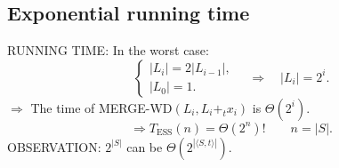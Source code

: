 \subsection{Exponential running time}
RUNNING TIME: In the worst case:
\[\begin{cases}|L_i|=2|L_{i-1}|,\\|L_0|=1.\end{cases}
\quad\Rightarrow\quad |L_i|=2^i.\]
$\Rightarrow$ The time of MERGE-WD$(L_i,L_i+_t x_i)$ is $\Theta(2^i)$.
\[\Rightarrow T_{\mathrm{ESS}}(n)=\Theta(2^n)!\qquad n=|S|.\]
OBSERVATION: $2^{|S|}$ can be $\Theta(2^{|\langle S,t\rangle|})$.

